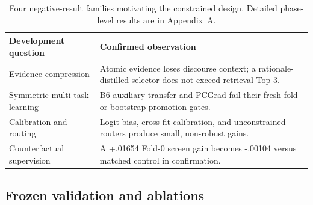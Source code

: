 \documentclass[11pt]{article}
\begin{document}
\begin{table}[t]
\centering\scriptsize
\begin{tabular}{@{}p{1.45cm}p{4.25cm}@{}}
\toprule
Development question & Confirmed observation\\
\midrule
Evidence compression & Atomic evidence loses discourse context; a rationale-distilled selector does not exceed retrieval Top-3.\\
Symmetric multi-task learning & B6 auxiliary transfer and PCGrad fail their fresh-fold or bootstrap promotion gates.\\
Calibration and routing & Logit bias, cross-fit calibration, and unconstrained routers produce small, non-robust gains.\\
Counterfactual supervision & A +.01654 Fold-0 screen gain becomes -.00104 versus matched control in confirmation.\\
\bottomrule
\end{tabular}
\caption{Four negative-result families motivating the constrained design. Detailed phase-level results are in Appendix~A.}\label{tab:negative-summary}
\end{table}

\subsection{Frozen validation and ablations}
\begin{table}[t]
\centering\scriptsize
{}
\caption{Frozen validation component ablations (validation is used only to evaluate fixed policies). ``Unconstrained confident switch'' selects the rationale-trained output of any class when its maximum probability is at least $\tau$. \textsc{CURE} applies the class-constrained AND rule at $\tau=.49$. Degenerate disagreement-only and max-confidence variants are omitted from the main table and reported in the accompanying ablation artifact. F1-S/R denote Supported/Refuted.}
\label{tab:ablation}
\end{table}
\end{document}
